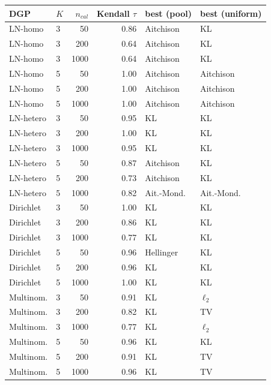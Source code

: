 \begin{tabular}{llrrll}
\toprule
DGP & $K$ & $n_{cal}$ & Kendall $\tau$ & best (pool) & best (uniform) \\
\midrule
LN-homo & 3 & 50 & 0.86 & Aitchison & KL \\
LN-homo & 3 & 200 & 0.64 & Aitchison & KL \\
LN-homo & 3 & 1000 & 0.64 & Aitchison & KL \\
LN-homo & 5 & 50 & 1.00 & Aitchison & Aitchison \\
LN-homo & 5 & 200 & 1.00 & Aitchison & Aitchison \\
LN-homo & 5 & 1000 & 1.00 & Aitchison & Aitchison \\
LN-hetero & 3 & 50 & 0.95 & KL & KL \\
LN-hetero & 3 & 200 & 1.00 & KL & KL \\
LN-hetero & 3 & 1000 & 0.95 & KL & KL \\
LN-hetero & 5 & 50 & 0.87 & Aitchison & KL \\
LN-hetero & 5 & 200 & 0.73 & Aitchison & KL \\
LN-hetero & 5 & 1000 & 0.82 & Ait.-Mond. & Ait.-Mond. \\
Dirichlet & 3 & 50 & 1.00 & KL & KL \\
Dirichlet & 3 & 200 & 0.86 & KL & KL \\
Dirichlet & 3 & 1000 & 0.77 & KL & KL \\
Dirichlet & 5 & 50 & 0.96 & Hellinger & KL \\
Dirichlet & 5 & 200 & 0.96 & KL & KL \\
Dirichlet & 5 & 1000 & 1.00 & KL & KL \\
Multinom. & 3 & 50 & 0.91 & KL & $\ell_2$ \\
Multinom. & 3 & 200 & 0.82 & KL & TV \\
Multinom. & 3 & 1000 & 0.77 & KL & $\ell_2$ \\
Multinom. & 5 & 50 & 0.96 & KL & KL \\
Multinom. & 5 & 200 & 0.91 & KL & TV \\
Multinom. & 5 & 1000 & 0.96 & KL & TV \\
\bottomrule
\end{tabular}
